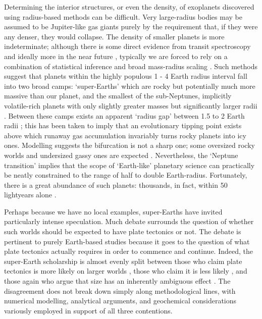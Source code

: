 \documentclass[a4paper,11pt,oneside]{book}
\begin{document}
Determining the interior structures, or even the density, of exoplanets discovered using radius-based methods can be difficult. Very large-radius bodies may be assumed to be Jupiter-like gas giants purely by the requirement that, if they were any denser, they would collapse. The density of smaller planets is more indeterminate; although there is some direct evidence from transit spectroscopy \cite{Valencia2013-ed} and ideally more in the near future \cite{Beichman2016-wp}, typically we are forced to rely on a combination of statistical inference and broad mass-radius scaling \citet{Rogers2009-jw, Dorn2017-gk}. Such methods suggest that planets within the highly populous 1 - 4 Earth radius interval fall into two broad camps: `super-Earths' which are rocky but potentially much more massive than our planet, and the smallest of the sub-Neptunes, implicitly volatile-rich planets with only slightly greater masses but significantly larger radii \cite{Dorn2017-gv}. Between these camps exists an apparent `radius gap' between 1.5 to 2 Earth radii \cite{Weiss2014-wk}; this has been taken to imply that an evolutionary tipping point exists above which runaway gas accumulation invariably turns rocky planets into icy ones. Modelling suggests the bifurcation is not a sharp one; some oversized rocky worlds and undersized gassy ones are expected \cite{Wolfgang2015-ko}. Nevertheless, the `Neptune transition' implies that the scope of `Earth-like' planetary science can practically be neatly constrained to the range of half to double Earth-radius. Fortunately, there is a great abundance of such planets: thousands, in fact, within 50 lightyears alone \citet{Heasarc2017-ht, NASA_Exoplanet_Science_Institute2019-lx}.

Perhaps because we have no local examples, super-Earths have invited particularly intense speculation. Much debate surrounds the question of whether such worlds should be expected to have plate tectonics or not. The debate is pertinent to purely Earth-based studies because it goes to the question of what plate tectonics actually requires in order to commence and continue. Indeed, the super-Earth scholarship is almost evenly split between those who claim plate tectonics is more likely on larger worlds \citet{Valencia2007-ae, Valencia2009-ia, Korenaga2010-kc, Van_Heck2011-lj, Foley2012-jc}, those who claim it is less likely \citet{ONeill2007-lk, ORourke2012-ax, Stamenkovic2012-kh, Stein2013-wy}, and those again who argue that size has an inherently ambiguous effect \citet{Karato2014-mw, Stamenkovic2016-rt, Kameyama2018-zl}. The disagreement does not break down simply along methodological lines, with numerical modelling, analytical arguments, and geochemical considerations variously employed in support of all three contentions.
\end{document}
